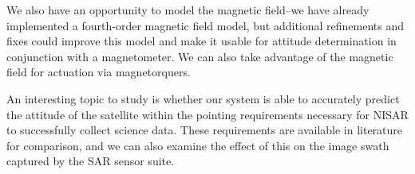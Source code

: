 We also have an opportunity to model the magnetic field–we have already implemented a fourth-order magnetic field model, but additional refinements and fixes could improve this model and make it usable for attitude determination in conjunction with a magnetometer. We can also take advantage of the magnetic field for actuation via magnetorquers.

An interesting topic to study is whether our system is able to accurately predict the attitude of the satellite within the pointing requirements necessary for NISAR to successfully collect science data. These requirements are available in literature for comparison, and we can also examine the effect of this on the image swath captured by the SAR sensor suite.